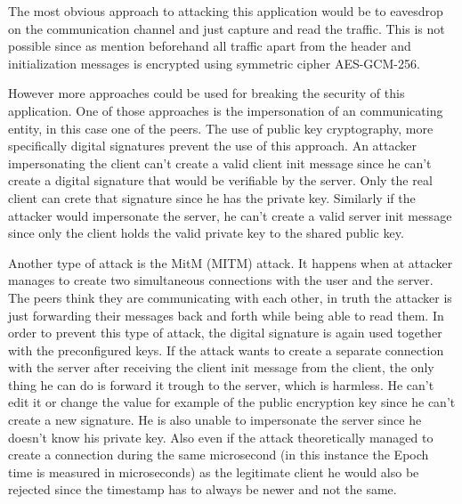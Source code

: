 The most obvious approach to attacking this application would be to eavesdrop on the communication channel and just capture and read the traffic. This is not possible since as mention beforehand all traffic apart from the header and initialization messages is encrypted using symmetric cipher AES-GCM-256.

However more approaches could be used for breaking the security of this application. One of those approaches is the impersonation of an communicating entity, in this case one of the peers. The use of public key cryptography, more specifically digital signatures prevent the use of this approach. An attacker impersonating the client can't create a valid client init message since he can't create a digital signature that would be verifiable by the server. Only the real client can crete that signature since he has the private key. Similarly if the attacker would impersonate the server, he can't create a valid server init message since only the client holds the valid private key to the shared public key.

Another type of attack is the MitM (\acl{MITM}) attack. It happens when at attacker manages to create two simultaneous connections with the user and the server. The peers think they are communicating with each other, in truth the attacker is just forwarding their messages back and forth while being able to read them. In order to prevent this type of attack, the digital signature is again used together with the preconfigured keys. If the attack wants to create a separate connection with the server after receiving the client init message from the client, the only thing he can do is forward it trough to the server, which is harmless. He can't edit it or change the value for example of the public encryption key since he can't create a new signature. He is also unable to impersonate the server since he doesn't know his private key. Also even if the attack theoretically managed to create a connection during the same microsecond (in this instance the Epoch time is measured in microseconds) as the legitimate client he would also be rejected since the timestamp has to always be newer and not the same.
